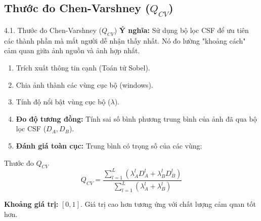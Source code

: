 \documentclass{beamer}
\begin{document}
\subsection{Thước đo Chen-Varshney ($Q_{CV}$)}

\begin{frame}{4.1. Thước đo Chen-Varshney ($Q_{CV}$)}
    \textbf{Ý nghĩa:} Sử dụng bộ lọc CSF để ưu tiên các thành phần mà mắt người dễ nhận thấy nhất. Nó đo lường "khoảng cách" cảm quan giữa ảnh nguồn và ảnh hợp nhất.
    \begin{enumerate}
        \item Trích xuất thông tin cạnh (Toán tử Sobel).
        \item Chia ảnh thành các vùng cục bộ (windows).
        \item Tính độ nổi bật vùng cục bộ ($\lambda$).
        \item \textbf{Đo độ tương đồng:} Tính sai số bình phương trung bình của ảnh đã qua bộ lọc CSF ($D_A, D_B$).
        \item \textbf{Đánh giá toàn cục:} Trung bình có trọng số của các vùng:
    \end{enumerate}

    \begin{block}{Thước đo $Q_{CV}$}
    \begin{equation}
        Q_{CV} = \frac{\sum_{l=1}^L \left( \lambda_A^l D_A^l + \lambda_B^l D_B^l \right)}{\sum_{l=1}^L \left( \lambda_A^l + \lambda_B^l \right)}
    \end{equation}
    \end{block}

    \vspace{0.2cm}
    \textbf{Khoảng giá trị:} $[0, 1]$. Giá trị cao hơn tương ứng với chất lượng cảm quan tốt hơn.
\end{frame}
\end{document}

